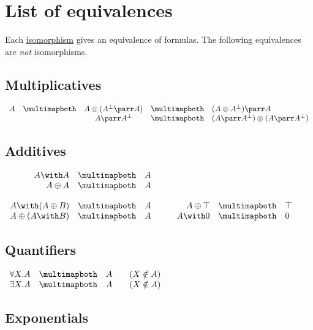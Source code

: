 \section{List of equivalences}\label{list-of-equivalences}

Each \hyperref[list-of-isomorphisms]{isomorphism} gives an equivalence of
formulas. The following equivalences are \emph{not} isomorphisms.

\subsection{Multiplicatives}\label{multiplicatives-1}

\(\begin{array}{rcccl}
A & \linequiv&  A \tens (A\orth\parr A) & \linequiv&  (A\tens A\orth)\parr A \\
&  &  A\parr A\orth & \linequiv&  (A\parr A\orth)\tens(A\parr A\orth)
\end{array}\)

\subsection{Additives}\label{additives-1}

\(\begin{array}{rclcrcl}
A \with A & \linequiv&  A \\
A \plus A & \linequiv&  A \\
\\
  A \with (A \plus B) & \linequiv&  A & \quad&  A \plus \top & \linequiv&  \top \\
  A \plus (A \with B) & \linequiv&  A & \quad&  A \with \zero & \linequiv&  \zero
\end{array}\)

\subsection{Quantifiers}\label{quantifiers}

\(\begin{array}{rcll}
  \forall X.A & \linequiv&  A & \quad (X\notin A) \\
  \exists X.A & \linequiv&  A & \quad (X\notin A)
\end{array}\)

\subsection{Exponentials}\label{exponentials-2}

